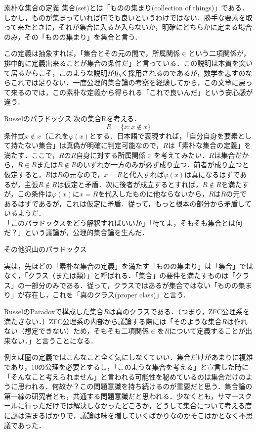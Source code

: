 \documentclass[uplatex, 12pt, a4paper, dvipdfmx]{jsarticle}
\begin{document}
\begin{itembox}[l]{素朴な集合の定義}
	集合(set)とは「ものの集まり(collection of things)」である．しかし，ものが集まっていれば何でも良いというわけではない．勝手な要素を取って来たときに，それが集合に入るか入らないか，明確にどちらかに定まる場合のみ，その「ものの集まり」を集合と言う．
\end{itembox}

この定義は抽象すれば，「集合とその元の間で，所属関係$\in$という二項関係が，排中的に定義出来ることが集合の条件だ」と言っている．この説明は本質を突いて居るからこそ，このような説明が広く採用されるのであるが，数学を志すのならこれでは足りない．一度公理的集合論の考察を経験してから，この文章に戻って来るのでは，この素朴な定義から得られる「これで良いんだ」という安心感が違う．

\begin{itembox}[l]{Russelのパラドックス}
	次の集合Rを考える．$$R=\{ x:x\notin x \}$$
	条件式$x\notin x$（これを$\varphi (x)$とする．日本語で表現すれば，「自分自身を要素として持たない集合」は真偽が明確に判定可能なので，$R$は「素朴な集合の定義」を満たす．ここで，$R$の$R$自身に対する所属関係$\in$を考えてみたい．$R$は集合だから，$R\in R$または$R\notin R$のいずれか一方のみが必ず成り立つ．前者が成り立つと仮定すると，$R$は$R$の元なので，$x=R$と代入すれば$\varphi (x)$は真になるはずであるが，主張$R\notin R$は仮定と矛盾．次に後者が成立するとすれば，$R\notin R$を満たすが，この条件は$\varphi (x)$に$x=R$を代入したものに他ならないから，$R$は$R$の元であるはずであるが，これは仮定に矛盾．従って，もっと根本の部分から矛盾しているようだ．\\
「このパラドックスをどう解釈すればいいか」「待てよ，そもそも集合とは何だ？」という議論が，公理的集合論を生んだ．
\end{itembox}


その他沢山のパラドックス

実は，先ほどの「素朴な集合の定義」を満たす「ものの集まり」は「集合」ではなく，「クラス（または類）」と呼ばれる．「集合」の要件を満たすものは「クラス」の一部分のみである．従って，クラスではあるが集合ではない「ものの集まり」が存在し，これを「真のクラス(proper class)」と言う．

RusselのParadoxで構成した集合$R$は真のクラスである．（つまり，ZFC公理系を満たさない．）ZFC公理系の内部から議論する際には「そのような集合$R$は作れない（想定できない）ため，そもそも二項関係$\in$を$R$について定義することが出来ない．」と言うことになる．

例えば圏の定義ではこんなこと全く気にしなくていい．集合だけがあまりに複雑であり，10の公理を必要とするし，「このような集合を考える」と宣言した時に「そんなこと考えられません」と言われる可能性を秘めているのは集合だけのように思われる．何故か？この問題意識を持ち続けるのが重要だと思う．集合論の第一線の研究者とも，共通する問題意識だと思われる．少なくとも，サマースクールに行っただけでは解決しなかったどころか，どうして集合について考える度に謎は深まるばかりで，議論は味を増していくばかりなのかそこはかとなく不思議であった．
\end{document}
